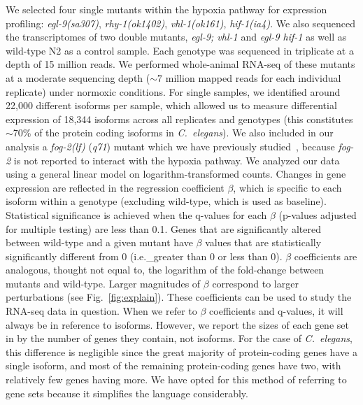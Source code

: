 \documentclass[9pt,twocolumn,twoside,lineno]{pnas-new}
\newcommand{\cel}{\emph{C.~elegans}}
\newcommand{\gene}[1]{\emph{#1}}
\newcommand{\fog}{\emph{\mbox{fog-2(lf)}}}
\begin{document}
We selected four single mutants within the hypoxia pathway for expression profiling:
\gene{egl-9}\emph{(sa307)}, \gene{rhy-1}\emph{(ok1402)},
\gene{vhl-1}\emph{(ok161)}, \gene{hif-1}\emph{(ia4)}. We also sequenced the
transcriptomes of two double mutants, \gene{egl-9; vhl-1} and \gene{egl-9 hif-1}
as well as wild-type N2 as a control sample. Each genotype  was sequenced in
triplicate at a depth of 15 million reads. We performed whole-animal RNA-seq of
these mutants at a moderate sequencing depth ($\sim7$ million mapped reads for
each individual replicate) under normoxic conditions. For single samples, we
identified around 22,000 different isoforms per sample, which allowed us to
measure differential expression of 18,344 isoforms across all replicates and
genotypes (this constitutes  $\sim$70\% of the protein coding isoforms in
\cel{}). We also included in our analysis a \fog{} (\emph{q71}) mutant which we
have previously studied~\cite{Angeles-Albores2016a}, because \gene{fog-2} is not
reported to interact with the hypoxia pathway.
We analyzed our data using a general linear model on logarithm-transformed counts.
Changes in gene expression are reflected in the regression coefficient $\beta$,
which is specific to each isoform within a genotype (excluding wild-type, which
is used as baseline). Statistical significance is achieved when the q-values for
each $\beta$ (p-values adjusted for multiple testing) are less than 0.1. Genes
that are significantly altered between wild-type and a given mutant have $\beta$
values that are statistically significantly different from 0 (i.e.\_greater than
0 or less than 0). $\beta$ coefficients are analogous, thought not equal to, the
logarithm of the fold-change between mutants and wild-type. Larger magnitudes of
$\beta$ correspond to larger perturbations (see Fig.~\ref{fig:explain}). These
coefficients can be used to study the RNA-seq data in question. When we refer to
$\beta$ coefficients and q-values, it will always be in reference to isoforms.
However, we report the sizes of each gene set in by the number of genes they
contain, not isoforms. For the case of \cel{}, this difference is negligible since
the great majority of protein-coding genes have a single isoform, and most of the
remaining protein-coding genes have two, with relatively few genes having more.
We have opted for this method of referring to gene sets because it simplifies the
language considerably.
\end{document}
